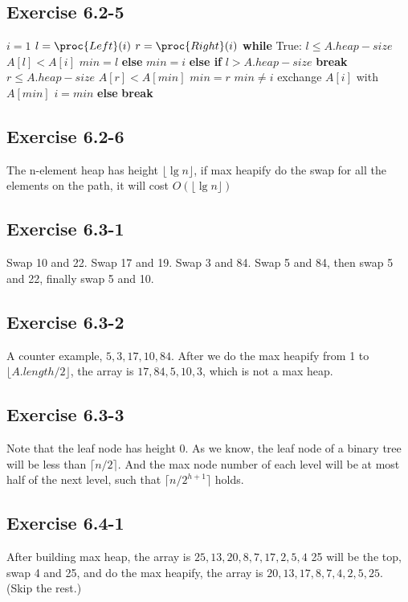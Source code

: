 \documentclass[12pt]{article}
\theoremstyle{definition}
\theoremstyle{remark}
\begin{document}
\subsection*{Exercise 6.2-5}
\begin{codebox}
\li $i=1$
\li $l=\proc{Left}(i)$
\li $r=\proc{Right}(i)$
\li \textbf{while} True:
\li \quad \If $l\le A.heap-size$
\li \qquad \If $A[l]<A[i]$ $min=l$
\li \qquad \textbf{else} $min=i$
\li \quad \textbf{else if} $l>A.heap-size$
\li \qquad \textbf{break}
\li \quad \If $r\le A.heap-size$
\li \qquad \If $A[r]<A[min]$ $min=r$
\li \quad \If $min\ne i$
\li \qquad exchange $A[i]$ with $A[min]$
\li \qquad $i=min$
\li \quad \textbf{else}
\li \qquad \textbf{break}
\end{codebox}
\subsection*{Exercise 6.2-6}
The n-element heap has height $\lfloor \lg{n}\rfloor$, if max heapify do the swap for all the elements on the path, it will cost $O(\lfloor \lg{n}\rfloor)$
\subsection*{Exercise 6.3-1}
Swap 10 and 22. Swap 17 and 19. Swap 3 and 84. Swap 5 and 84, then swap 5 and 22, finally swap 5 and 10.
\subsection*{Exercise 6.3-2}
A counter example, $5,3,17,10,84$. After we do the max heapify from 1 to $\lfloor A.length/2\rfloor$, the array is $17,84,5,10,3$, which is not a max heap.
\subsection*{Exercise 6.3-3}
Note that the leaf node has height 0. As we know, the leaf node of a binary tree will be less than $\lceil n/2\rceil$. And the max node number of each level will be at most half of the next level, such that $\lceil n/2^{h+1}\rceil$ holds.
\subsection*{Exercise 6.4-1}
After building max heap, the array is $25,13,20,8,7,17,2,5,4$  25 will be the top, swap 4 and 25, and do the max heapify, the array is $20,13,17,8,7,4,2,5,25$. (Skip the rest.)
\end{document}
